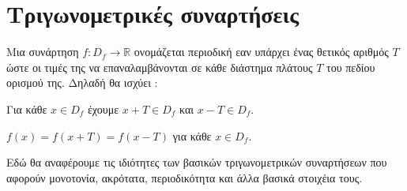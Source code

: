 \section{Τριγωνομετρικές συναρτήσεις}
\orismoi
{}
Μια συνάρτηση $ f:D_f\rightarrow\mathbb{R} $ ονομάζεται περιοδική εαν υπάρχει ένας θετικός αριθμός $ T $ ώστε οι τιμές της να επαναλαμβάνονται σε κάθε διάστημα πλάτους $ T $ του πεδίου ορισμού της. Δηλαδή θα ισχύει :
\begin{rlist}
\item Για κάθε $ x\in D_f $ έχουμε $ x+T\in D_f $ και $ x-T\in D_f $.
\item $ f(x)=f(x+T)=f(x-T) $ για κάθε $ x\in D_f $.
\end{rlist}
\thewrhmata
{}
Εδώ θα αναφέρουμε τις ιδιότητες των βασικών τριγωνομετρικών συναρτήσεων που αφορούν μονοτονία, ακρότατα, περιοδικότητα και άλλα βασικά στοιχέια τους.

